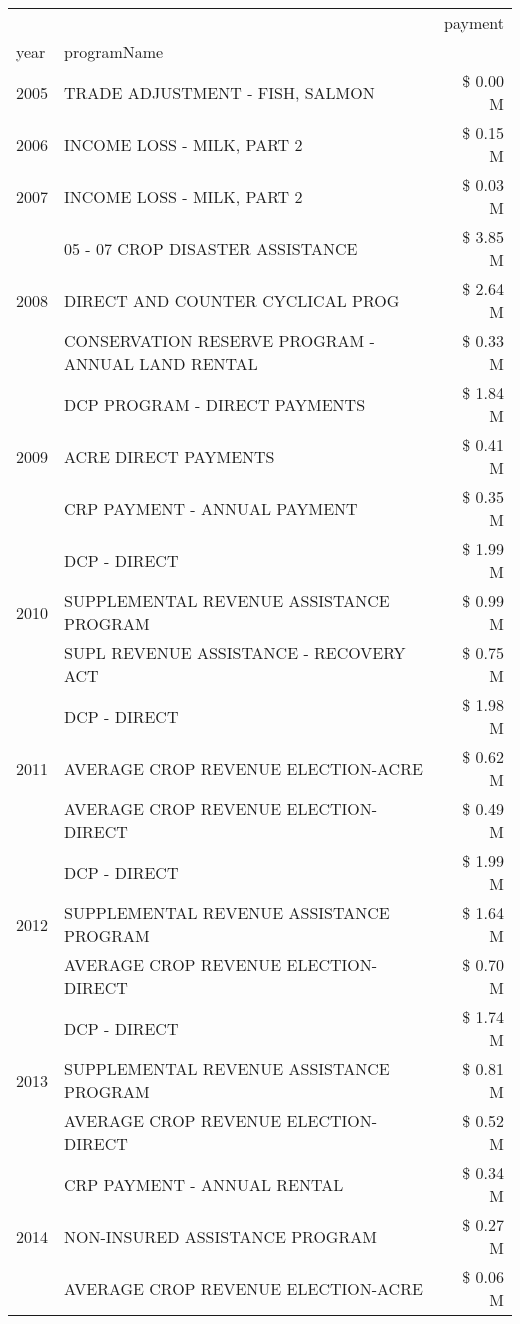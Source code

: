 \begin{tabular}{llr}
\toprule
 &  & payment \\
year & programName &  \\
\midrule
2005 & TRADE ADJUSTMENT - FISH, SALMON & \$ 0.00 M \\
\cline{1-3}
2006 & INCOME LOSS - MILK, PART 2 & \$ 0.15 M \\
\cline{1-3}
2007 & INCOME LOSS - MILK, PART 2 & \$ 0.03 M \\
\cline{1-3}
\multirow[t]{3}{*}{2008} & 05 - 07 CROP DISASTER ASSISTANCE & \$ 3.85 M \\
 & DIRECT AND COUNTER CYCLICAL PROG & \$ 2.64 M \\
 & CONSERVATION RESERVE PROGRAM - ANNUAL LAND RENTAL & \$ 0.33 M \\
\cline{1-3}
\multirow[t]{3}{*}{2009} & DCP PROGRAM - DIRECT PAYMENTS & \$ 1.84 M \\
 & ACRE DIRECT PAYMENTS & \$ 0.41 M \\
 & CRP PAYMENT - ANNUAL PAYMENT & \$ 0.35 M \\
\cline{1-3}
\multirow[t]{3}{*}{2010} & DCP - DIRECT & \$ 1.99 M \\
 & SUPPLEMENTAL REVENUE ASSISTANCE PROGRAM & \$ 0.99 M \\
 & SUPL REVENUE ASSISTANCE - RECOVERY ACT & \$ 0.75 M \\
\cline{1-3}
\multirow[t]{3}{*}{2011} & DCP - DIRECT & \$ 1.98 M \\
 & AVERAGE CROP REVENUE ELECTION-ACRE & \$ 0.62 M \\
 & AVERAGE CROP REVENUE ELECTION-DIRECT & \$ 0.49 M \\
\cline{1-3}
\multirow[t]{3}{*}{2012} & DCP - DIRECT & \$ 1.99 M \\
 & SUPPLEMENTAL REVENUE ASSISTANCE PROGRAM & \$ 1.64 M \\
 & AVERAGE CROP REVENUE ELECTION-DIRECT & \$ 0.70 M \\
\cline{1-3}
\multirow[t]{3}{*}{2013} & DCP - DIRECT & \$ 1.74 M \\
 & SUPPLEMENTAL REVENUE ASSISTANCE PROGRAM & \$ 0.81 M \\
 & AVERAGE CROP REVENUE ELECTION-DIRECT & \$ 0.52 M \\
\cline{1-3}
\multirow[t]{3}{*}{2014} & CRP PAYMENT - ANNUAL RENTAL & \$ 0.34 M \\
 & NON-INSURED ASSISTANCE PROGRAM & \$ 0.27 M \\
 & AVERAGE CROP REVENUE ELECTION-ACRE & \$ 0.06 M \\

\end{tabular}
